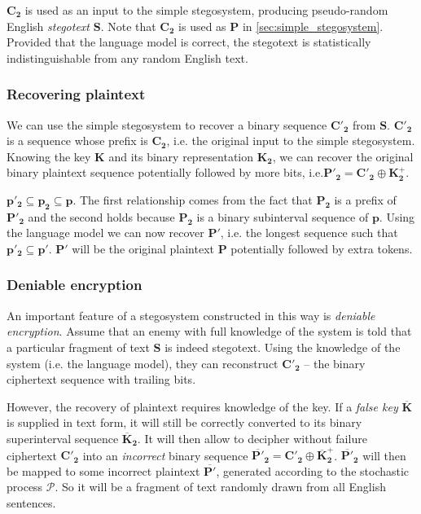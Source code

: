 \documentclass[draft]{IIBproject}
\makeatletter
\DeclareRobustCommand*{\ie}{i.e.\@\xspace}
\makeatother
\begin{document}
$\mathbf{C_2}$ is used as an input to the simple stegosystem, producing pseudo-random English \emph{stegotext} $\mathbf S$. Note that $\mathbf{C_2}$ is used as $\mathbf P$ in \cref{sec:simple_stegosystem}. Provided that the language model is correct, the stegotext is statistically indistinguishable from any random English text.

\subsubsection{Recovering plaintext}

We can use the simple stegosystem to recover a binary sequence $\mathbf{C'_2}$ from $\mathbf S$. $\mathbf{C'_2}$ is a sequence whose prefix is $\mathbf{C_2}$, \ie the original input to the simple stegosystem. Knowing the key $\mathbf K$ and its binary representation $\mathbf{K_2}$, we can recover the original binary plaintext sequence potentially followed by more bits, \ie $\mathbf{P'_2} = \mathbf{C'_2} \oplus \mathbf{K^+_2}$.

$\mathbf {p'_2} \subseteq \mathbf {p_2} \subseteq \mathbf p$. The first relationship comes from the fact that $\mathbf{P_2}$ is a prefix of $\mathbf{P'_2}$ and the second holds because $\mathbf{P_2}$ is a binary subinterval sequence of $\mathbf p$. Using the language model we can now recover $\mathbf{P'}$, \ie the longest sequence such that $\mathbf {p'_2} \subseteq \mathbf {p'}$. $\mathbf{P'}$ will be the original plaintext $\mathbf P$ potentially followed by extra tokens.

\subsubsection{Deniable encryption}

An important feature of a stegosystem constructed in this way is \emph{deniable encryption}. Assume that an enemy with full knowledge of the system is told that a particular fragment of text $\mathbf S$ is indeed stegotext. Using the knowledge of the system (\ie the language model), they can reconstruct $\mathbf {C'_2}$ -- the binary ciphertext sequence with trailing bits.

However, the recovery of plaintext requires knowledge of the key. If a \emph{false key} $\mathbf {\overline K}$ is supplied in text form, it will still be correctly converted to its binary superinterval sequence $\mathbf {\overline K_2}$. It will then allow to decipher without failure ciphertext $\mathbf{C'_2}$ into an \emph{incorrect} binary sequence $\mathbf {\overline {P'}_2} = \mathbf{C'_2} \oplus \mathbf {\overline K^+_2}$. $\mathbf {\overline {P'}_2}$ will then be mapped to some incorrect plaintext $\mathbf {\overline {P'}}$, generated according to the stochastic process $\mathcal P$. So it will be a fragment of text randomly drawn from all English sentences.
\end{document}
